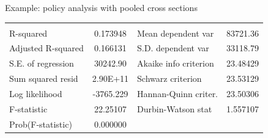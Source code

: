 \documentclass[usenames,dvipsnames]{beamer}
\begin{document}
\begin{frame}{Example: policy analysis with pooled cross sections}
\begin{table}[]
\begin{tabular}{lclcc}
                                & \multicolumn{1}{l}{} &                                & \multicolumn{1}{l}{} & \multicolumn{1}{l}{}      \\
R-squared                       & 0.173948             & \multicolumn{2}{l}{Mean dependent var}                & 83721.36                  \\
Adjusted R-squared              & 0.166131             & \multicolumn{2}{l}{S.D. dependent var}                & 33118.79                  \\
S.E. of regression              & 30242.90             & \multicolumn{2}{l}{Akaike info criterion}             & 23.48429                  \\
Sum squared resid               & 2.90E+11             & \multicolumn{2}{l}{Schwarz criterion}                 & 23.53129                  \\
Log likelihood                  & -3765.229            & \multicolumn{2}{l}{Hannan-Quinn criter.}              & 23.50306                  \\
F-statistic                     & 22.25107             & \multicolumn{2}{l}{Durbin-Watson stat}                & 1.557107                  \\
Prob(F-statistic)               & 0.000000             & \multicolumn{2}{l}{}                                  & \multicolumn{1}{l}{}     
\end{tabular}
\end{table}
\end{frame}
\end{document}
